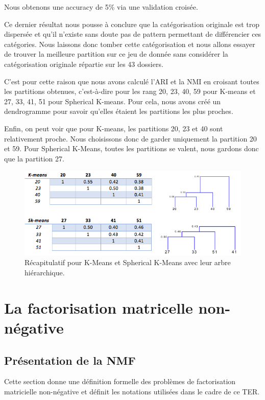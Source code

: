 \documentclass[runningheads]{llncs}
\begin{document}
Nous obtenons une accuracy de 5\% via une validation croisée.

Ce dernier résultat nous pousse à conclure que la catégorisation originale est trop dispersée et qu'il n'existe sans doute pas de pattern permettant de différencier ces catégories.
Nous laissons donc tomber cette catégorisation et nous allons essayer de trouver la meilleure partition sur ce jeu de donnée sans considérer la catégorisation originale répartie sur les 43 dossiers.

C'est pour cette raison que nous avons calculé l'ARI et la NMI en croisant toutes les partitions obtenues, c'est-à-dire pour les rang 20, 23, 40, 59 pour K-means et 27, 33, 41, 51 pour Spherical K-means. Pour cela, nous avons créé un dendrogramme pour savoir qu'elles étaient les partitions les plus proches.

Enfin, on peut voir que pour K-means, les partitions 20, 23 et 40 sont relativement proche. Nous choisissons donc de garder uniquement la partition 20 et 59.
Pour Spherical K-Means, toutes les partitions se valent, nous gardons donc que la partition 27.


\begin{figure}[H]
\centering
\includegraphics[width=1\textwidth]{ari_nmi.png}
\caption{Récapitulatif pour K-Means et Spherical K-Means avec leur arbre hiérarchique.}
  \label{fig:k_sk-means}
\end{figure}


\section{La factorisation matricelle non-négative}
\subsection{Présentation de la NMF}
\label{nmf}

Cette section donne une d\'efinition formelle des probl\`emes de factorisation matricielle non-n\'egative \cite{Gaujoux2010} et d\'efinit les notations utilis\'ees dans le cadre de ce TER.
\end{document}
